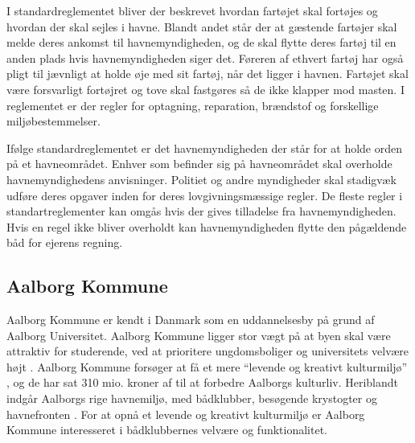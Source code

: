 I standardreglementet bliver der beskrevet hvordan fartøjet skal fortøjes og hvordan der skal sejles i havne. Blandt andet står der at gæstende fartøjer skal melde deres ankomst til havnemyndigheden, og de skal flytte deres fartøj til en anden plads hvis havnemyndigheden siger det. Føreren af ethvert fartøj har også pligt til jævnligt at holde øje med sit fartøj, når det ligger i havnen. Fartøjet skal være forsvarligt fortøjret og tove skal fastgøres så de ikke klapper mod masten. I reglementet er der regler for optagning, reparation, brændstof og forskellige miljøbestemmelser.

Ifølge standardreglementet er det havnemyndigheden der står for at holde orden på et havneområdet. Enhver som befinder sig på havneområdet skal overholde havnemyndighedens anvisninger. Politiet og andre myndigheder skal stadigvæk udføre deres opgaver inden for deres lovgivningsmæssige regler. De fleste regler i standartreglementer kan omgås hvis der gives tilladelse fra havnemyndigheden. Hvis en regel ikke bliver overholdt kan havnemyndigheden flytte den pågældende båd for ejerens regning.


\subsection{Aalborg Kommune}

Aalborg Kommune er kendt i Danmark som en uddannelsesby på grund af Aalborg Universitet. Aalborg Kommune ligger stor vægt på at byen skal være attraktiv for studerende, ved at prioritere ungdomsboliger og universitets velvære højt \cite{udd-strat-aalborg}. Aalborg Kommune forsøger at få et mere \enquote{levende og kreativt kulturmiljø} \cite{AalborgSatserPaaKultur}, og de har sat 310 mio. kroner af til at forbedre Aalborgs kulturliv. Heriblandt indgår Aalborgs rige havnemiljø, med bådklubber, besøgende krystogter og havnefronten \cite{AalborgHavnefront}. For at opnå et levende og kreativt kulturmiljø er Aalborg Kommune interesseret i bådklubbernes velvære og funktionalitet.

